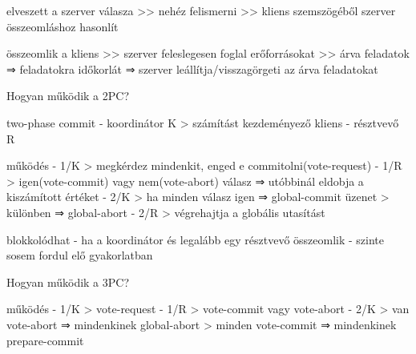 \documentclass[twoside, a4paper, 12pt]{article}
\begin{document}
\begin{description}
                                    \item elveszett a szerver válasza
                                        >> nehéz felismerni >> kliens szemszögéből szerver összeomláshoz hasonlít
                                    \item összeomlik a kliens
                                        >> szerver feleslegesen foglal erőforrásokat >> árva feladatok
                                        ⇒ feladatokra időkorlát
                                        ⇒ szerver leállítja/visszagörgeti az árva feladatokat
                                    \item  Hogyan működik a 2PC?
                                    \item two-phase commit
                                        - koordinátor K 
                                        > számítást kezdeményező kliens
                                        - résztvevő R
                                    \item működés
                                        - 1/K
                                        > megkérdez mindenkit, enged e commitolni(vote-request)
                                        - 1/R
                                        > igen(vote-commit) vagy nem(vote-abort) válasz ⇒ utóbbinál eldobja a kiszámított értéket
                                        - 2/K
                                        > ha minden válasz igen ⇒ global-commit üzenet
                                        > különben ⇒ global-abort
                                        - 2/R
                                        > végrehajtja a globális utasítást
                                    \item blokkolódhat
                                        - ha a koordinátor és legalább egy résztvevő összeomlik
                                        - szinte sosem fordul elő gyakorlatban
                                    \item  Hogyan működik a 3PC?
                                    \item működés
                                        - 1/K
                                        > vote-request
                                        - 1/R
                                        > vote-commit vagy vote-abort
                                        - 2/K
                                        > van vote-abort ⇒ mindenkinek global-abort 
                                        > minden vote-commit ⇒ mindenkinek prepare-commit

\end{description}
\end{document}
